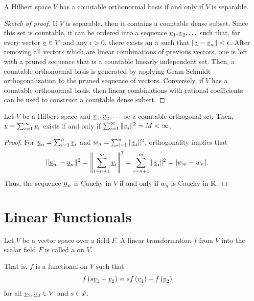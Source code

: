 \begin{theorem} \label{theorem:SeparableHilbertSpace}
A Hilbert space $V$ has a countable orthonormal basis if and only if $V$ is separable.
\end{theorem}
\begin{proof}[Sketch of proof]
If $V$ is separable, then it contains a countable dense subset.
Since this set is countable, it can be ordered into a sequence $\underline{v}_1 , \underline{v}_2 , \ldots$ such that, for every vector $\underline{v}\in V$ and any $\epsilon>0$, there exists an $n$ such that $\left\| \underline{v} - \underline{v}_n \right\| < \epsilon$.
After removing all vectors which are linear combinations of previous vectors, one is left with a pruned sequence that is a countable linearly independent set.
Then, a countable orthonormal basis is generated by applying Gram-Schmidt orthogonalization to the pruned sequence of vectors.
Conversely, if $V$ has a countable orthonormal basis, then linear combinations with rational coefficients can be used to construct a countable dense subset.
\end{proof}

\begin{lemma} \label{lem:hilbert_sum_convergence}
Let $V$ be a Hilbert space and $\underline{v}_1,\underline{v}_2,\ldots$ be a countable orthogonal set.
Then, $\underline{v} = \sum_{i=1}^\infty \underline{v}_i$ exists if and only if $\sum_{i=1}^\infty \|\underline{v}_i\|^2 = M < \infty$.
\end{lemma}
\begin{proof}
For $\underline{u}_n = \sum_{i=1}^n \underline{v}_i$ and $w_n = \sum_{i=1}^n \|\underline{v}_i\|^2$, orthogonality implies that
\[\|\underline{u}_m - \underline{u}_n\|^2 = \left\| \sum_{i=n+1}^m \underline{v}_i \right\|^2 = \sum_{i=n+1}^m \|\underline{v}_i \|^2 = | w_m - w_n|. \]
Thus, the sequence $\underline{u}_n$ is Cauchy in $V$ if and only if $w_n$ is Cauchy in $\mathbb{R}$.
\end{proof}


\section{Linear Functionals}

\begin{definition}
Let $V$ be a vector space over a field $F$.
A linear transformation $f$ from $V$ into the scalar field $F$ is called a  on $V$.
\end{definition}
That is, $f$ is a functional on $V$ such that
\begin{equation*}
f \left( s \underline{v}_1 + \underline{v}_2 \right)
= s f \left( \underline{v}_1 \right) + f \left( \underline{v}_2 \right)
\end{equation*}
for all $\underline{v}_1, \underline{v}_2 \in V$ and $s \in F$.

